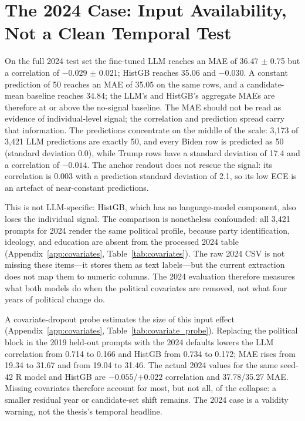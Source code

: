\section{The 2024 Case: Input Availability, Not a Clean Temporal Test}

On the full 2024 test set the fine-tuned LLM reaches an MAE of 36.47 $\pm$ 0.75
but a correlation of $-0.029$ $\pm$ 0.021; HistGB reaches 35.06 and $-0.030$. A
constant prediction of 50 reaches an MAE of 35.05 on the same rows, and a
candidate-mean baseline reaches 34.84; the LLM's and HistGB's aggregate MAEs are
therefore at or above the no-signal baseline. The MAE should not be read as
evidence of individual-level signal; the correlation and prediction spread carry
that information. The predictions concentrate on the middle of the scale: 3,173
of 3,421 LLM predictions are exactly 50, and every Biden row is predicted as 50
(standard deviation 0.0), while Trump rows have a standard deviation of 17.4 and
a correlation of $-0.014$. The anchor readout does not rescue the signal: its
correlation is 0.003 with a prediction standard deviation of 2.1, so its low ECE
is an artefact of near-constant predictions.

This is not LLM-specific: HistGB, which has no language-model component, also
loses the individual signal. The comparison is nonetheless confounded: all 3,421
prompts for 2024 render the same political profile, because party identification,
ideology, and education are absent from the processed 2024 table
(Appendix~\ref{app:covariates}, Table~\ref{tab:covariates}). The raw 2024 CSV is
not missing these items---it stores them as text labels---but the current
extraction does not map them to numeric columns. The 2024 evaluation therefore
measures what both models do when the political covariates are removed, not what
four years of political change do.

A covariate-dropout probe estimates the size of this input effect
(Appendix~\ref{app:covariates}, Table~\ref{tab:covariate_probe}). Replacing the
political block in the 2019 held-out prompts with the 2024 defaults lowers the
LLM correlation from 0.714 to 0.166 and HistGB from 0.734 to 0.172; MAE rises
from 19.34 to 31.67 and from 19.04 to 31.46. The actual 2024 values for the same
seed-42 R model and HistGB are $-0.055$/$+0.022$ correlation and 37.78/35.27 MAE.
Missing covariates therefore account for most, but not all, of the collapse: a
smaller residual year or candidate-set shift remains. The 2024 case is a
validity warning, not the thesis's temporal headline.

